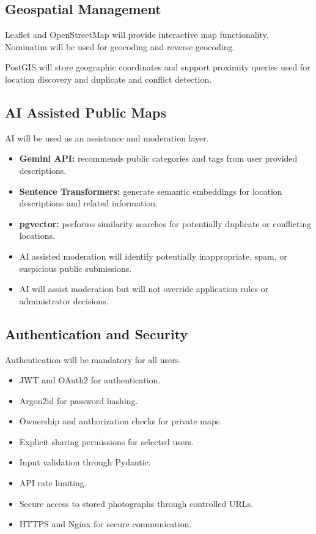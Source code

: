 \documentclass[11pt,a4paper]{article}
\begin{document}
\subsection{Geospatial Management}

Leaflet and OpenStreetMap will provide interactive map functionality.
Nominatim will be used for geocoding and reverse geocoding.

PostGIS will store geographic coordinates and support proximity queries used
for location discovery and duplicate and conflict detection.

\subsection{AI Assisted Public Maps}

AI will be used as an assistance and moderation layer.

\begin{itemize}[leftmargin=0.7cm]
    \item \textbf{Gemini API:} recommends public categories and tags from
    user provided descriptions.
    
    \item \textbf{Sentence Transformers:} generate semantic embeddings for
    location descriptions and related information.
    
    \item \textbf{pgvector:} performs similarity searches for potentially
    duplicate or conflicting locations.
    
    \item AI assisted moderation will identify potentially inappropriate,
    spam, or suspicious public submissions.
    
    \item AI will assist moderation but will not override application rules
    or administrator decisions.
\end{itemize}

\subsection{Authentication and Security}

Authentication will be mandatory for all users.

\begin{itemize}[leftmargin=0.7cm]
    \item JWT and OAuth2 for authentication.
    \item Argon2id for password hashing.
    \item Ownership and authorization checks for private maps.
    \item Explicit sharing permissions for selected users.
    \item Input validation through Pydantic.
    \item API rate limiting.
    \item Secure access to stored photographs through controlled URLs.
    \item HTTPS and Nginx for secure communication.
\end{itemize}
\end{document}

